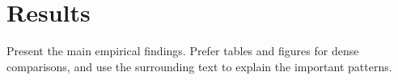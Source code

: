 \section{Results}
\label{sec:results}

Present the main empirical findings. Prefer tables and figures for dense
comparisons, and use the surrounding text to explain the important patterns.
